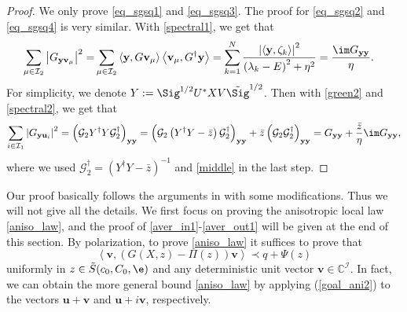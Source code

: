 \begin{proof}
We only prove \eqref{eq_sgsq1} and \eqref{eq_sgsq3}. The proof for \eqref{eq_sgsq2} and \eqref{eq_sgsq4} is very similar. With  \eqref{spectral1}, we get that
\begin{align}\label{middle}
\sum_{\mu  \in \mathcal I_2 } {\left| {G_{\mathbf y \mathbf v_\mu } } \right|^2 } =& \sum_{\mu  \in \mathcal I_2 } \left\langle \mathbf y,G {\mathbf v_\mu  } \right\rangle \left\langle {\mathbf v_\mu}, G^\dag \mathbf y \right\rangle  = \sum_{k = 1}^N {\frac{{\left| {\left\langle {\mathbf y,\zeta _k } \right\rangle } \right|^2  }}{{\left( {\lambda _k  - E} \right)^2  + \eta ^2 }} }   =\frac{{\im  G_{\mathbf y\mathbf y} }}{\eta }.
\end{align}
For simplicity, we denote $Y:=\Sig^{1/2} U^{*}X V\tilde \Sig^{1/2}$. Then with \eqref{green2} and \eqref{spectral2}, we get that
\begin{align*}
 \sum_{i \in \mathcal I_1 } {\left| {G_{\mathbf y\mathbf u_i} } \right|^2 } =  \left( {{\mathcal G_2} Y^\dag Y \mathcal G_2^\dag  } \right)_{\mathbf y\mathbf y}=  \left( {{\mathcal G_2} \left(Y^\dag Y-\bar z\right) \mathcal G_2^\dag  } \right)_{\mathbf y\mathbf y} + \bar z \left( {{\mathcal G_2} \mathcal G_2^\dag  } \right)_{\mathbf y\mathbf y} =  {G}_{\mathbf y\mathbf y}  +\frac{\bar z}{\eta} \im G_{\mathbf y\mathbf y}  ,
 \end{align*}
 where we used $\mathcal G_2^\dag= \left(Y^\dag Y-\bar z\right)^{-1}$ and \eqref{middle} in the last step.
\end{proof}


Our proof basically follows the arguments in \cite[Section 7]{Anisotropic} with some modifications. Thus we will not give all the details. We first focus on proving the anisotropic local law \eqref{aniso_law}, and the proof of \eqref{aver_in1}-\eqref{aver_out1} will be given at the end of this section. By polarization, to prove \eqref{aniso_law} it suffices to prove that %
 \begin{equation}\label{goal_ani2}
\left\langle \mathbf v, \left(G(X,z)- \Pi(z)\right) \mathbf v \right\rangle \prec q+\Psi(z)
\end{equation}
uniformly in $z\in \tilde S(c_0,C_0,\e)$ and any deterministic unit vector $ \mathbf v\in{\mathbb C}^{\mathcal I}$. In fact, we can obtain the more general bound \eqref{aniso_law}
by applying (\ref{goal_ani2}) to the vectors $\mathbf u + \mathbf v$ and $\mathbf u + i\mathbf v$, respectively.

